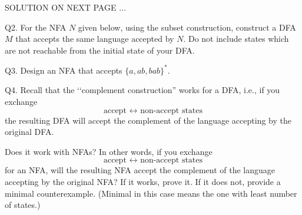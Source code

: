 SOLUTION ON NEXT PAGE ...

\newpage

\SOLUTION




\newpage

Q2.
For the NFA $N$ given below, 
using the subset construction, construct a DFA $M$ that accepts
the same language accepted by $N$. 
Do not include states which are not 
reachable from the initial state of your DFA.

\begin{center}
\end{center}

\SOLUTION






\newpage

Q3. Design an NFA that accepts $\{a, ab, bab\}^*$.

\SOLUTION







\newpage

Q4. Recall that the \lq\lq complement construction''
works for a DFA, i.e., if you exchange
\[
\text{accept $\leftrightarrow$ non-accept states}
\]
the resulting DFA will accept the complement of the language
accepting by the original DFA.

Does it work with NFAs?
In other words, if you exchange 
\[
\text{accept $\leftrightarrow$ non-accept states}
\]
for an NFA,
will the 
resulting NFA accept the complement of the language
accepting by the original NFA?
If it works, prove it.
If it does not, provide a minimal counterexample.
(Minimal in this case means the one with least number of 
states.)

\SOLUTION





